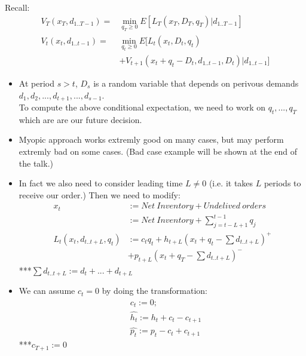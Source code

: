 \documentclass{beamer}
\begin{document}
\begin{frame}
Recall: 
    \begin{eqnarray*}
    V_T(x_T,d_{1..T-1}) =& \min_{q_T \geq 0} E[L_T(x_T,D_T,q_T) | d_{1..T-1}]\\
    V_t(x_t,d_{1..t-1}) =& \min_{q_t \geq 0} E[L_t(x_t,D_t,q_t)\\
                        &+V_{t+1}(x_t + q_t - D_t, d_{1..t-1},D_t)|d_{1..t-1}]
    \end{eqnarray*}
    \begin{itemize}
      \item 
        At period $s>t$, $D_s$ is a random variable that depends on perivous demands $d_1, d_2,...,d_{t+1},...,d_{s-1}$.\\
        To compute the above conditional expectation, we need to work on $q_t,...,q_T$ which are are our future decision.\\
      \item
        Myopic approach works extremly good on many cases, but may perform extremly bad on some cases. (Bad case example will be shown at the end of the talk.)
    \end{itemize}
\end{frame}


\begin{frame}
    \begin{itemize}
      \item 
        In fact we also need to consider leading time $L \neq 0$ (i.e. it takes $L$ periods to receive our order.) Then we need to modify:
        \begin{eqnarray*}
          x_t & := Net~Inventory + Undelived~orders\\
              & := Net~Inventory + \sum_{j = t - L+1}^{t-1} q_j\\
          L_t(x_t,d_{t..t+L},q_t)& :=c_tq_t + h_{t+L}(x_t + q_t - \sum d_{t..t+L})^{+} \\ 
                                &  + p_{t+L}(x_t + q_T - \sum d_{t..t+L})^{-}
        \end{eqnarray*}
        ***$ \sum d_{t..t+L} := d_t + ... + d_{t+L}$\\
      \item
        We can assume $c_t = 0$ by doing the transformation:
        \begin{eqnarray*}
          &\hat{c_t} := 0;\\
          &\hat{h_t} := h_t + c_t - c_{t+1}\\
          &\hat{p_t} := p_t - c_t + c_{t+1}
        \end{eqnarray*}
        ***$c_{T+1} := 0$
      \end{itemize}
\end{frame}
\end{document}
